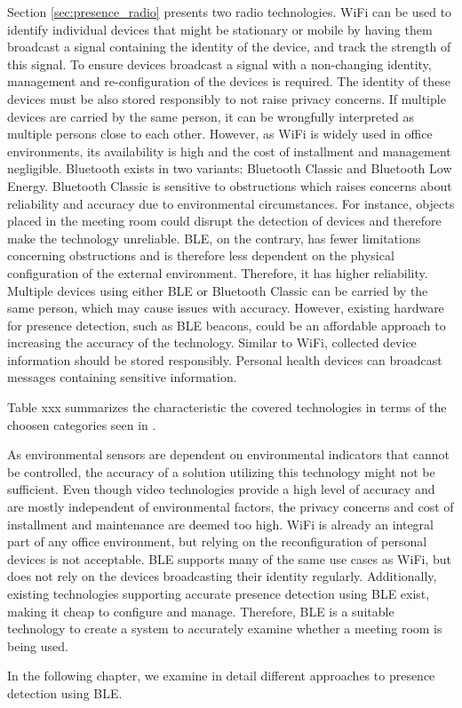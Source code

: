 Section \ref{sec:presence_radio} presents two radio technologies. 
WiFi can be used to identify individual devices that might be stationary or mobile by having them broadcast a signal containing the identity of the device, and track the strength of this signal.
To ensure devices broadcast a signal with a non-changing identity, management and re-configuration of the devices is required.
The identity of these devices must be also stored responsibly to not raise privacy concerns.
If multiple devices are carried by the same person, it can be wrongfully interpreted as multiple persons close to each other. 
However, as WiFi is widely used in office environments, its availability is high and the cost of installment and management negligible.
Bluetooth exists in two variants: Bluetooth Classic and Bluetooth Low Energy.
Bluetooth Classic is sensitive to obstructions which raises concerns about reliability and accuracy due to environmental circumstances. 
For instance, objects placed in the meeting room could disrupt the detection of devices and therefore make the technology unreliable.
BLE, on the contrary, has fewer limitations concerning obstructions and is therefore less dependent on the physical configuration of the external environment. 
Therefore, it has higher reliability.
Multiple devices using either BLE or Bluetooth Classic can be carried by the same person, which may cause issues with accuracy.
However, existing hardware for presence detection, such as BLE beacons, could be an affordable approach to increasing the accuracy of the technology.  
Similar to WiFi, collected device information should be stored responsibly.
Personal health devices can broadcast messages containing sensitive information.

Table xxx summarizes the characteristic the covered technologies in terms of the choosen categories seen in .






As environmental sensors are dependent on environmental indicators that cannot be controlled, the accuracy of a solution utilizing this technology might not be sufficient.
Even though video technologies provide a high level of accuracy and are mostly independent of environmental factors, the privacy concerns and cost of installment and maintenance are deemed too high.
WiFi is already an integral part of any office environment, but relying on the reconfiguration of personal devices is not acceptable. 
BLE supports many of the same use cases as WiFi, but does not rely on the devices broadcasting their identity regularly.
Additionally, existing technologies supporting accurate presence detection using BLE exist, making it cheap to configure and manage. 
Therefore, BLE is a suitable technology to create a system to accurately examine whether a meeting room is being used.

In the following chapter, we examine in detail different approaches to presence detection using BLE.